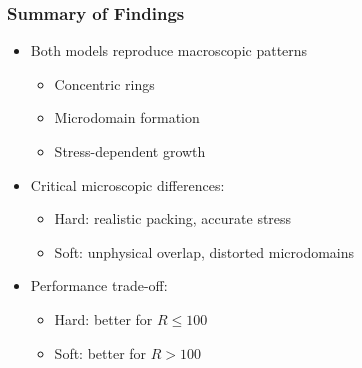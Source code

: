 \documentclass[
	10pt,
	t
]{beamer}
\begin{document}
\begin{frame}
    \frametitle{Summary of Findings}

    \begin{itemize}
        \item Both models reproduce macroscopic patterns
              \begin{itemize}
                  \item Concentric rings
                  \item Microdomain formation
                  \item Stress-dependent growth
              \end{itemize}
        \item Critical microscopic differences:
              \begin{itemize}
                  \item Hard: realistic packing, accurate stress
                  \item Soft: unphysical overlap, distorted microdomains
              \end{itemize}
        \item Performance trade-off:
              \begin{itemize}
                  \item Hard: better for $R \leq 100$
                  \item Soft: better for $R > 100$
              \end{itemize}
    \end{itemize}

\end{frame}
\end{document}
